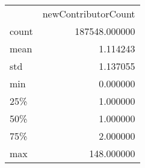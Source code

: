 \begin{tabular}{lr}
 & newContributorCount \\
count & 187548.000000 \\
mean & 1.114243 \\
std & 1.137055 \\
min & 0.000000 \\
25\% & 1.000000 \\
50\% & 1.000000 \\
75\% & 2.000000 \\
max & 148.000000 \\
\end{tabular}
